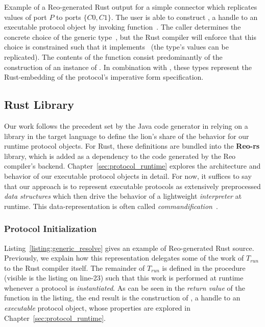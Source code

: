 \begin{listing}[ht]
	\centering
	\inputminted[]{rust}{generic_resolve.rs}
	\caption[Simple Reo compiler Rust output.]{Example of a Reo-generated Rust output for a simple connector which replicates values of port $P$ to ports $\{C0, C1\}$. The user is able to construct , a handle to an executable protocol object by invoking function~. The caller determines the concrete choice of the generic type~, but the Rust compiler will enforce that this choice is constrained such that it implements~ (the type's values can be replicated). The contents of the function consist predominantly of the construction of an instance of . In combination with , these types represent the Rust-embedding of the protocol's imperative form specification.}
	\label{listing:generic_resolve}
\end{listing}

\subsection{Rust Library}
\label{sec:translation_phase_2}
Our work follows the precedent set by the Java code generator in relying on a library in the target language to define the lion's share of the behavior for our runtime protocol objects. For Rust, these definitions are bundled into the \textbf{Reo-rs} library, which is added as a dependency to the code generated by the Reo compiler's backend. Chapter~\ref{sec:protocol_runtime} explores the architecture and behavior of our executable protocol objects in detail. For now, it suffices to say that our approach is to represent executable protocols as extensively preprocessed \textit{data structures} which then drive the behavior of a lightweight \textit{interpreter} at runtime. This data-representation is often called \textit{commandification}~\cite{nystrom2014game}. 


\subsubsection{Protocol Initialization}
Listing~\ref{listing:generic_resolve} gives an example of Reo-generated Rust source. Previously, we explain how this representation delegates some of the work of $T_{run}$ to the Rust compiler itself. The remainder of $T_{run}$ is defined in the  procedure (visible is the listing on line-23) such that this work is performed at runtime whenever a protocol is \textit{instantiated}. As can be seen in the \textit{return value} of the function in the listing, the end result is the construction of , a handle to an \textit{executable} protocol object, whose properties are explored in Chapter~\ref{sec:protocol_runtime}.

